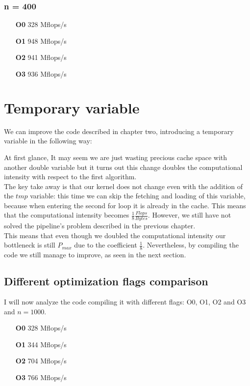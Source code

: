 \documentclass[11pt,a4paper,oneside,titlepage,openright]{book}
\begin{document}
\subsection{ n = 400}

\begin{itemize}
\item[\textbf{O0}] 328  Mflops/s
\item[\textbf{O1}] 948 Mflops/s
\item[\textbf{O2}] 941 Mflops/s
\item[\textbf{O3}] 936 Mflops/s
\end{itemize}




\chapter{Temporary variable}

We can improve the code described in chapter two, introducing a temporary variable in the following way: 


At first glance, It may seem we are just wasting precious cache space with another double variable but it turns out this change doubles the computational intensity with respect to the first algorithm. \\
The key take away is that our kernel does not change even with the addition of the $\textit{tmp}$ variable: this time we can skip the fetching and loading of this variable, because when entering the second for loop it is already in the cache. This means that the computational intensity becomes $\frac{1}{8}\frac{Flops}{Bytes}$. 
However, we still have not solved the pipeline's problem described in the previous chapter. \\
This means that even though we doubled the computational intensity our bottleneck is still $P_{max}$ due to the coefficient $\frac{1}{8}$.  
Nevertheless, by compiling the code we still manage to improve, as seen in the next section. 

\section{Different optimization flags comparison}
I will now analyze the code compiling it with different flags: O0, O1, O2 and O3 and $n = 1000$.

\begin{itemize}
\item[\textbf{O0}] 328  Mflops/s
\item[\textbf{O1}] 344 Mflops/s
\item[\textbf{O2}] 704 Mflops/s
\item[\textbf{O3}] 766 Mflops/s
\end{itemize}
\end{document}
